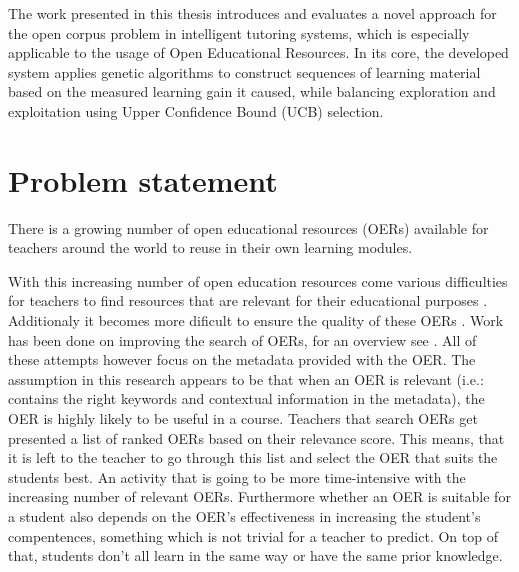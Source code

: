 The work presented in this thesis introduces and evaluates a novel approach for
the open corpus problem in intelligent tutoring systems, which is especially
applicable to the usage of Open Educational Resources.
In its core, the developed system applies genetic algorithms to construct
sequences of learning material based on the measured learning gain it caused,
while balancing exploration and exploitation using Upper Confidence Bound (UCB)
selection.


\section{Problem statement}
There is a growing number of open educational resources (OERs) available for
teachers around the world to reuse in their own learning modules.

With this increasing number of open education resources come various
difficulties for teachers to find resources that
are relevant for their educational purposes \citep{Ochoa2011}. Additionaly it
becomes more dificult to ensure the quality of these OERs \citep{Cechinel2011}.
Work has been done on improving the search of OERs, for an overview see
\citep{Ochoa2008}. All of these attempts however focus on the metadata provided
with the OER. The assumption in this research appears to be that when an OER is
relevant (i.e.: contains the right keywords and contextual information in the
metadata), the OER is highly likely to be useful in a course. Teachers that
search OERs get presented a list of ranked OERs based on their relevance score.
This means, that it is left to the teacher to go through this list and select
the OER that suits the students best. An activity that is going to be more
time-intensive with the increasing number of relevant OERs. Furthermore whether
an OER is suitable for a student also depends on the OER’s effectiveness in
increasing the student’s compentences, something which is not trivial for a
teacher to predict. On top of that, students don't all learn in the same way or
have the same prior knowledge.

